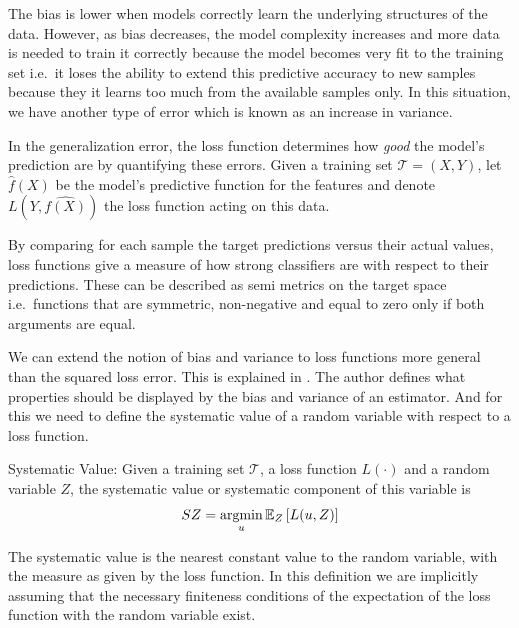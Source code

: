 The bias is lower when models correctly learn the underlying structures of the data. However, as bias decreases, the model complexity increases and more data is needed to train it correctly because the model becomes very fit to the training set i.e.\ it loses the ability to extend this predictive accuracy to new samples because they it learns too much from the available samples only. In this situation, we have another type of error which is known as an increase in variance.

In the generalization error, the loss function determines how \textit{good} the model's prediction are by quantifying these errors. Given a training set $\mathcal{T} = (X,Y)$, let $\hat{f}(X)$ be the model's predictive function for the features and denote $L( Y,\hat{f(X)} )$ the loss function acting on this data.

By comparing for each sample the target predictions versus their actual values, loss functions give a measure of how strong classifiers are with respect to their predictions. These can be described as semi metrics on the target space i.e.\ functions that are symmetric, non-negative and equal to zero only if both arguments are equal.


We can extend the notion of bias and variance to loss functions more general than the squared loss error. This is explained in \textcite{james-biasVarianceGeneral}. The author defines what properties should be displayed by the bias and variance of an estimator. And for this we need to define the systematic value of a random variable with respect to a loss function.


\begin{definition}{Systematic Value:}
Given a training set $\mathcal{T}$, a loss function $L(\cdot)$ and a random variable $Z$, the systematic value or systematic component of this variable is
$$ SZ =  \operatorname*{argmin}_u \operatorname{\mathbb{E}}_{Z} \left[ L(u,Z) \right]$$
\end{definition}

The systematic value is the nearest constant value to the random variable, with the measure as given by the loss function. In this definition we are implicitly assuming that the necessary finiteness conditions of the expectation of the loss function with the random variable exist.


